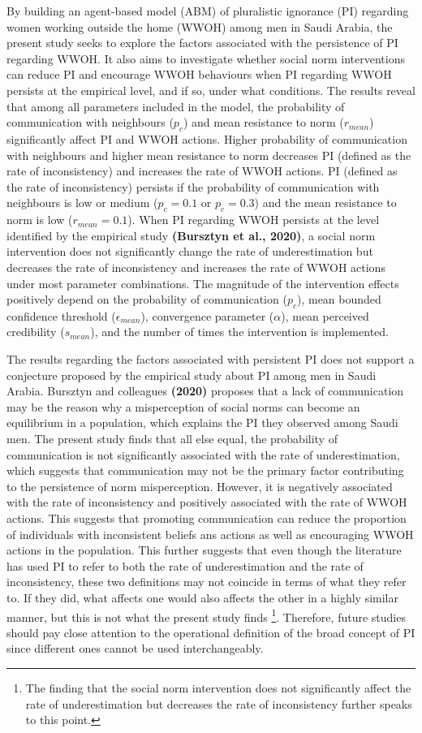 \documentclass[
  11pt,
]{article}
\begin{document}
By building an agent-based model (ABM) of pluralistic ignorance (PI)
regarding women working outside the home (WWOH) among men in Saudi
Arabia, the present study seeks to explore the factors associated with
the persistence of PI regarding WWOH. It also aims to investigate
whether social norm interventions can reduce PI and encourage WWOH
behaviours when PI regarding WWOH persists at the empirical level, and
if so, under what conditions. The results reveal that among all
parameters included in the model, the probability of communication with
neighbours (\(p_c\)) and mean resistance to norm (\(r_{mean}\))
significantly affect PI and WWOH actions. Higher probability of
communication with neighbours and higher mean resistance to norm
decreases PI (defined as the rate of inconsistency) and increases the
rate of WWOH actions. PI (defined as the rate of inconsistency) persists
if the probability of communication with neighbours is low or medium
(\(p_c = 0.1\) or \(p_c = 0.3\)) and the mean resistance to norm is low
(\(r_{mean} = 0.1\)). When PI regarding WWOH persists at the level
identified by the empirical study \textbf{(Bursztyn et al., 2020)}, a
social norm intervention does not significantly change the rate of
underestimation but decreases the rate of inconsistency and increases
the rate of WWOH actions under most parameter combinations. The
magnitude of the intervention effects positively depend on the
probability of communication (\(p_c\)), mean bounded confidence
threshold (\(\epsilon_{mean}\)), convergence parameter (\(\alpha\)),
mean perceived credibility (\(s_{mean}\)), and the number of times the
intervention is implemented.

The results regarding the factors associated with persistent PI does not
support a conjecture proposed by the empirical study about PI among men
in Saudi Arabia. Bursztyn and colleagues \textbf{(2020)} proposes that a
lack of communication may be the reason why a misperception of social
norms can become an equilibrium in a population, which explains the PI
they observed among Saudi men. The present study finds that all else
equal, the probability of communication is not significantly associated
with the rate of underestimation, which suggests that communication may
not be the primary factor contributing to the persistence of norm
misperception. However, it is negatively associated with the rate of
inconsistency and positively associated with the rate of WWOH actions.
This suggests that promoting communication can reduce the proportion of
individuals with inconsistent beliefs ans actions as well as encouraging
WWOH actions in the population. This further suggests that even though
the literature has used PI to refer to both the rate of underestimation
and the rate of inconsistency, these two definitions may not coincide in
terms of what they refer to. If they did, what affects one would also
affects the other in a highly similar manner, but this is not what the
present study finds
\footnote{The finding that the social norm intervention does not significantly affect the rate of underestimation but decreases the rate of inconsistency further speaks to this point.}.
Therefore, future studies should pay close attention to the operational
definition of the broad concept of PI since different ones cannot be
used interchangeably.
\end{document}

